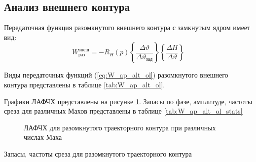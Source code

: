 \subsection{Анализ внешнего контура}
Передаточная функция разомкнутого внешнего контура с замкнутым ядром имеет вид:
\begin{equation}
    W_{раз}^{внеш} = -R_H(p) \left\{ \frac{\Delta \vartheta}{\Delta \vartheta_{зад}} \right\} \left\{ \frac{\Delta H }{\Delta \vartheta} \right\} 
    \label{eq:W_ap_alt_ol}
\end{equation}

Виды передаточных функций (\ref{eq:W_ap_alt_ol}) разомкнутого внешнего контура представлены в таблице \ref{tab:W_ap_alt_ol}.

\begin{table}[H]
    \centering
    \caption{Передаточные функции разомкнутого внешнего контура при различных скоростных напорах}
    \label{tab:W_ap_alt_ol}

\end{table}

Графики ЛАФЧХ представлены на рисунке \ref{fig:W_ap_alt_ol}. Запасы по фазе,
амплитуде, частоты среза для различных Махов представлены в таблице
\ref{tab:W_ap_alt_ol_stats}

\begin{figure}[H]
    \centering
    
    \caption{ЛАФЧХ для разомкнутого траекторного контура при различных числах Маха}
    \label{fig:W_ap_alt_ol}
\end{figure}

\begin{table}[H]
    \centering
    \caption{Запасы, частоты среза для разомкнутого траекторного контура}
    \label{tab:W_ap_alt_ol_stats}
    
\end{table}

